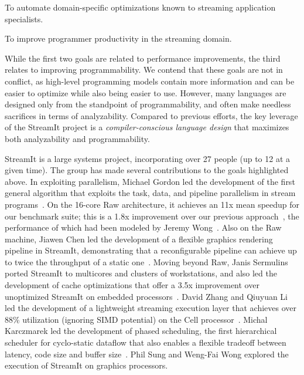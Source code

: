 \item To automate domain-specific optimizations known to streaming
  application specialists.

\item To improve programmer productivity in the streaming domain.

\myend

While the first two goals are related to performance improvements, the
third relates to improving programmability.  We contend that these
goals are not in conflict, as high-level programming models contain
more information and can be easier to optimize while also being easier
to use.  However, many languages are designed only from the standpoint
of programmability, and often make needless sacrifices in terms of
analyzability.  Compared to previous efforts, the key leverage of the
StreamIt project is a {\it compiler-conscious language design} that
maximizes both analyzability and programmability.


StreamIt is a large systems project, incorporating over 27 people (up
to 12 at a given time).  The group has made several contributions to
the goals highlighted above.  In exploiting parallelism, Michael
Gordon led the development of the first general algorithm that
exploits the task, data, and pipeline parallelism in stream
programs~\cite{gordon-asplos06}.  On the 16-core Raw architecture, it
achieves an 11x mean speedup for our benchmark suite; this is a 1.8x
improvement over our previous
approach~\cite{gordon-asplos02,gordon-thesis}, the performance of
which had been modeled by Jeremy Wong~\cite{wong-thesis}.  Also on the
Raw machine, Jiawen Chen led the development of a flexible graphics
rendering pipeline in StreamIt, demonstrating that a reconfigurable
pipeline can achieve up to twice the throughput of a static
one~\cite{chen-graphics05,chen_load-balanced_2005}.  Moving beyond
Raw, Janis Sermulins ported StreamIt to multicores and clusters of
workstations, and also led the development of cache optimizations that
offer a 3.5x improvement over unoptimized StreamIt on embedded
processors~\cite{sermulins-lctes05,sermulins-thesis}.  David Zhang and
Qiuyuan Li led the development of a lightweight streaming execution
layer that achieves over 88\% utilization (ignoring SIMD potential) on
the Cell processor~\cite{zhang_lightweight_2007,zhang-thesis}.  Michal
Karczmarek led the development of phased scheduling, the first
hierarchical scheduler for cyclo-static dataflow that also enables a
flexible tradeoff between latency, code size and buffer
size~\cite{karczmarek-lctes03,karczma-thesis}.  Phil Sung and Weng-Fai
Wong explored the execution of StreamIt on graphics processors.

